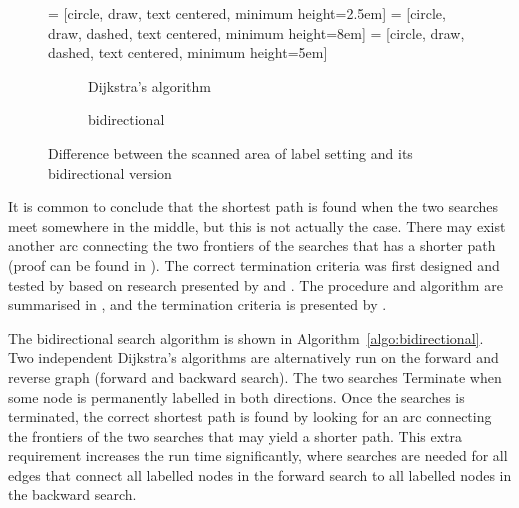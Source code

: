 \begin{figure}[H]
     = [circle, draw, text centered, minimum height=2.5em]
     = [circle, draw, dashed, text centered, minimum height=8em]
     = [circle, draw, dashed, text centered, minimum height=5em]
    \centering
    \begin{subfigure}[t]{.4\textwidth}
        \centering
        \caption{Dijkstra's algorithm}
    \end{subfigure}
    \begin{subfigure}[t]{.4\textwidth}
        \centering
        \caption{bidirectional}
    \end{subfigure}
    \caption{Difference between the scanned area of label setting and its bidirectional version}
    \label{fig:bidirect}
\end{figure}

It is common to conclude that the shortest path is found when the two searches meet somewhere in the middle,
but this is not actually the case.
There may exist another arc connecting the two frontiers of the searches that has a shorter path (proof can be found in \citet{Klunder}).
The correct termination criteria was first designed and tested by \citet{Pohl} based on research presented by \citet{Dantzig, Nicholson} and \citet{Dreyfus}.
The procedure and algorithm are summarised in \citet{Klunder}, and the termination criteria is presented by \citet{Pohl}.

The bidirectional search algorithm is shown in Algorithm~\ref{algo:bidirectional}.
Two independent Dijkstra's algorithms are alternatively run on the forward and reverse graph (forward and backward search).
The two searches Terminate when some node is permanently labelled in both directions.
Once the searches is terminated,
the correct shortest path is found by looking for an arc connecting the frontiers of the two searches that may yield a shorter path.
This extra requirement increases the run time significantly, 
where searches are needed for all edges that connect all labelled nodes in the forward search to all labelled nodes in the backward search.

